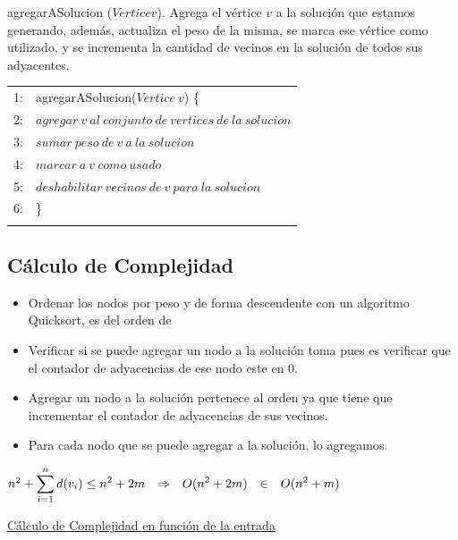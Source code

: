\documentclass[a4paper, 10pt]{article}
\begin{document}
agregarASolucion ($Vertice v$). Agrega el v\'ertice $v$ a la soluci\'on que estamos generando, adem\'as, actualiza el peso de la misma, se marca ese v\'ertice como utilizado, y se incrementa la cantidad de vecinos en la soluci\'on de todos sus adyacentes. \\

\begin{tabular}{rp{17cm}}
1: & 				agregarASolucion($Vertice \ v$) \{\\
2: & \hspace{0,5cm} 	$agregar \ v \ al \ conjunto \ de \ vertices \ de \ la \ solucion$ \\
3: & \hspace{0,5cm} 	$sumar \ peso \ de \ v \ a \ la \ solucion$ \\
4: & \hspace{0,5cm} 	$marcar \ a \ v \ como \ usado$ \\
5: & \hspace{0,5cm} 	$deshabilitar \ vecinos \ de \ v \ para \ la \ solucion$ \\
6: & 				\}\\ \\
\end{tabular}

\subsection{C\'alculo de Complejidad}

\begin{itemize}
	\item Ordenar los nodos por peso y de forma descendente con un algoritmo Quicksort, es del orden de 
	\item Verificar si se puede agregar un nodo a la soluci\'on toma  pues es verificar que el contador de adyacencias de ese nodo este en 0.
	\item Agregar un nodo a la soluci\'on pertenece al orden  ya que tiene que incrementar el contador de adyacencias de sus vecinos.
	\item Para cada nodo que se puede agregar a la soluci\'on, lo agregamos.  
\end{itemize}

\begin{center}
	\ensuremath{n^2 + \zum{i=1}{n}{d(v_i)} \leq n^2 + 2m \entonces \ode{n^2 + 2m} \pertenece \ode{n^2 + m}}
\end{center}

\underline{C\'alculo de Complejidad en funci\'on de la entrada}
\end{document}
